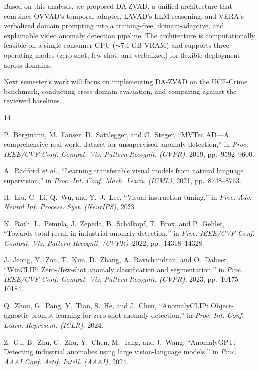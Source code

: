 Based on this analysis, we proposed DA-ZVAD, a unified architecture that combines OVVAD's temporal adapter, LAVAD's LLM reasoning, and VERA's verbalized domain prompting into a training-free, domain-adaptive, and explainable video anomaly detection pipeline. The architecture is computationally feasible on a single consumer GPU ($\sim$7.1 GB VRAM) and supports three operating modes (zero-shot, few-shot, and verbalized) for flexible deployment across domains.

Next semester's work will focus on implementing DA-ZVAD on the UCF-Crime benchmark, conducting cross-domain evaluation, and comparing against the reviewed baselines.




\begin{thebibliography}{14}

P.~Bergmann, M.~Fauser, D.~Sattlegger, and C.~Steger,
``MVTec AD---A comprehensive real-world dataset for unsupervised anomaly detection,''
in \textit{Proc. IEEE/CVF Conf. Comput. Vis. Pattern Recognit. (CVPR)}, 2019, pp.~9592--9600.

A.~Radford \textit{et al.},
``Learning transferable visual models from natural language supervision,''
in \textit{Proc. Int. Conf. Mach. Learn. (ICML)}, 2021, pp.~8748--8763.

H.~Liu, C.~Li, Q.~Wu, and Y.~J.~Lee,
``Visual instruction tuning,''
in \textit{Proc. Adv. Neural Inf. Process. Syst. (NeurIPS)}, 2023.

K.~Roth, L.~Pemula, J.~Zepeda, B.~Sch{\"o}lkopf, T.~Brox, and P.~Gehler,
``Towards total recall in industrial anomaly detection,''
in \textit{Proc. IEEE/CVF Conf. Comput. Vis. Pattern Recognit. (CVPR)}, 2022, pp.~14318--14328.

J.~Jeong, Y.~Zou, T.~Kim, D.~Zhang, A.~Ravichandran, and O.~Dabeer,
``WinCLIP: Zero-/few-shot anomaly classification and segmentation,''
in \textit{Proc. IEEE/CVF Conf. Comput. Vis. Pattern Recognit. (CVPR)}, 2023, pp.~10175--10184.

Q.~Zhou, G.~Pang, Y.~Tian, S.~He, and J.~Chen,
``AnomalyCLIP: Object-agnostic prompt learning for zero-shot anomaly detection,''
in \textit{Proc. Int. Conf. Learn. Represent. (ICLR)}, 2024.

Z.~Gu, B.~Zhu, G.~Zhu, Y.~Chen, M.~Tang, and J.~Wang,
``AnomalyGPT: Detecting industrial anomalies using large vision-language models,''
in \textit{Proc. AAAI Conf. Artif. Intell. (AAAI)}, 2024.


\end{thebibliography}
